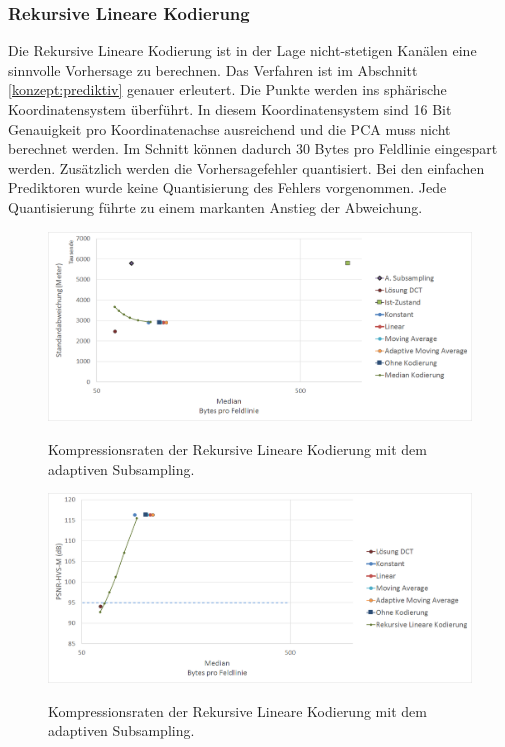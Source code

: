 \subsubsection{Rekursive Lineare Kodierung} \label{resultate:loesung2:wavelet}
Die Rekursive Lineare Kodierung ist in der Lage nicht-stetigen Kanälen eine sinnvolle Vorhersage zu berechnen. Das Verfahren ist im Abschnitt \ref{konzept:prediktiv} genauer erleutert. Die Punkte werden ins sphärische Koordinatensystem überführt. In diesem Koordinatensystem sind 16 Bit Genauigkeit pro Koordinatenachse ausreichend und die PCA muss nicht berechnet werden. Im Schnitt können dadurch $30$ Bytes pro Feldlinie eingespart werden. 
Zusätzlich werden die Vorhersagefehler quantisiert. Bei den einfachen Prediktoren wurde keine Quantisierung des Fehlers vorgenommen. Jede Quantisierung führte zu einem markanten Anstieg der Abweichung.\\
\begin{figure}[!htbp]
	\center
	\includegraphics[width=1\textwidth,keepaspectratio]{./pictures/resultate/loesung2/variante2/resultate.png}
		\label{resultate:loesung2:adaptive:median}
		\caption{Kompressionsraten der Rekursive Lineare Kodierung mit dem adaptiven Subsampling.}
\end{figure}
\begin{figure}[!htbp]
	\includegraphics[width=1\textwidth,keepaspectratio]{./pictures/resultate/loesung2/variante2/resultate_psnr.png}
	\label{resultate:loesung2:adaptive:median_psnr}
	\caption{Kompressionsraten der Rekursive Lineare Kodierung mit dem adaptiven Subsampling.}
\end{figure}
